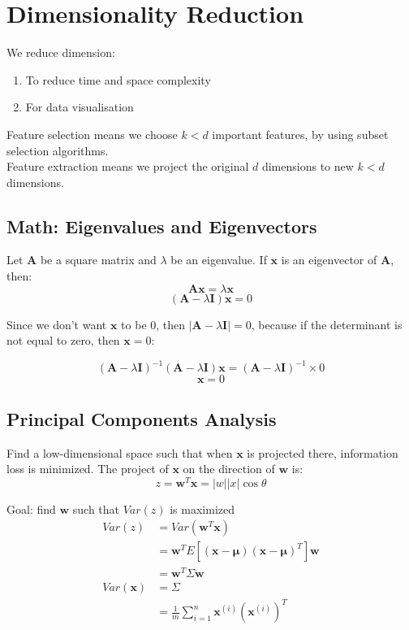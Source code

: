 \chapter{Dimensionality Reduction}

\begin{multicols*}{2}
\noindent We reduce dimension:
\begin{enumerate}
    \item To reduce time and space complexity
    \item For data visualisation 
\end{enumerate}

\noindent Feature selection means we choose $k<d$ important features, by using subset selection algorithms. \\

\noindent Feature extraction means we project the original $d$ dimensions to new $k<d$ dimensions.

\section{Math: Eigenvalues and Eigenvectors}

\noindent Let $\mathbf{A}$ be a square matrix and $\lambda$ be an eigenvalue. If $\mathbf{x}$ is an eigenvector of $\mathbf{A}$, then:
$$\mathbf{Ax} = \lambda \mathbf{x}$$ 
$$(\mathbf{A}-\lambda \mathbf{I})\mathbf{x} = 0$$

\noindent Since we don't want $\mathbf{x}$ to be 0, then $|\mathbf{A} - \lambda \mathbf{I}|=0$, because if the determinant is not equal to zero, then $\mathbf{x} = 0$:

$$(\mathbf{A}-\lambda \mathbf{I})^{-1}(\mathbf{A}-\lambda \mathbf{I})\mathbf{x} = (\mathbf{A}-\lambda \mathbf{I})^{-1} \times 0$$
$$\mathbf{x} = 0$$

\section{Principal Components Analysis}

\noindent Find a low-dimensional space such that when $\mathbf{x}$ is projected there, information loss is minimized. The project of $\mathbf{x}$ on the direction of $\mathbf{w}$ is:
$$z=\mathbf{w}^{T}\mathbf{x}=|w||x| \cos \theta$$

\noindent Goal: find $\mathbf{w}$ such that $Var(z)$ is maximized
\begin{equation*}
\begin{split}
    Var(z) &= Var(\mathbf{w}^{T}\mathbf{x}) \\
    &= \mathbf{w}^{T} E[(\mathbf{x}-\mathbf{\mu})(\mathbf{x}-\mathbf{\mu})^{T}] \mathbf{w} \\
    &= \mathbf{w}^{T} \Sigma \mathbf{w}\\
    Var(\mathbf{x}) &= \Sigma \\
    &= \frac{1}{m} \sum_{i=1}^n \mathbf{x}^{(i)} (\mathbf{x}^{(i)})^{T}
\end{split}
\end{equation*}


\end{multicols*}
